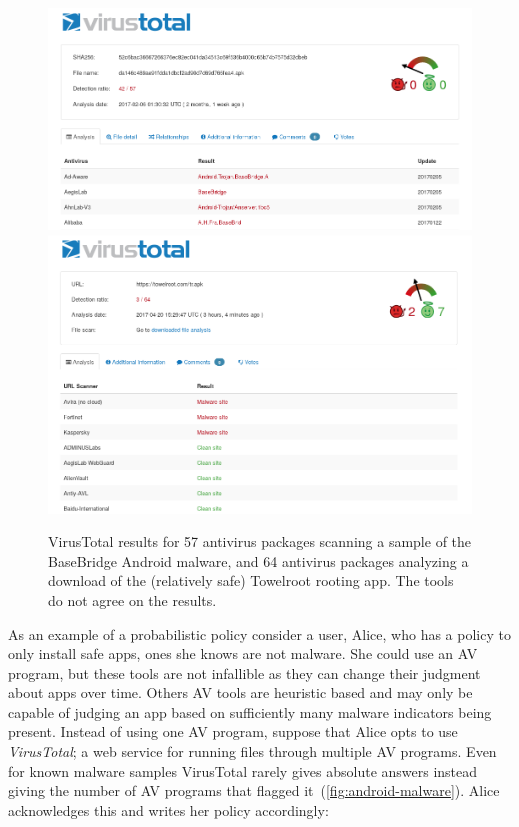 \documentclass[thesis.tex]{subfiles}
\begin{document}
\begin{figure}
  \centering
  \includegraphics[width=0.99\linewidth]{figures/android-malware.png}
  \includegraphics[width=0.99\linewidth]{figures/towelroot.png}
  \caption[VirusTotal results for two Android apps.]{VirusTotal
    results for 57 antivirus packages scanning a sample of the BaseBridge
    Android malware, and 64 antivirus packages analyzing a download of the
    (relatively safe) Towelroot rooting app.  The tools do not agree on
    the results.}
  \label{fig:android-malware}
\end{figure}

As an example of a probabilistic policy consider a user, Alice, who
has a policy to only install safe apps, ones she knows are not
malware. She could use an \ac{AV} program, but these tools are not
infallible as they can change their judgment about apps over
time. Others AV tools are heuristic based and may only be capable of
judging an app based on sufficiently many malware indicators being
present. Instead of using one \ac{AV} program, suppose that Alice opts
to use \emph{VirusTotal}; a web service for running files through
multiple \ac{AV} programs. Even for known malware samples VirusTotal
rarely gives absolute answers instead giving the number of \ac{AV}
programs that flagged it~(\autoref{fig:android-malware}). Alice
acknowledges this and writes her policy accordingly:
\end{document}
